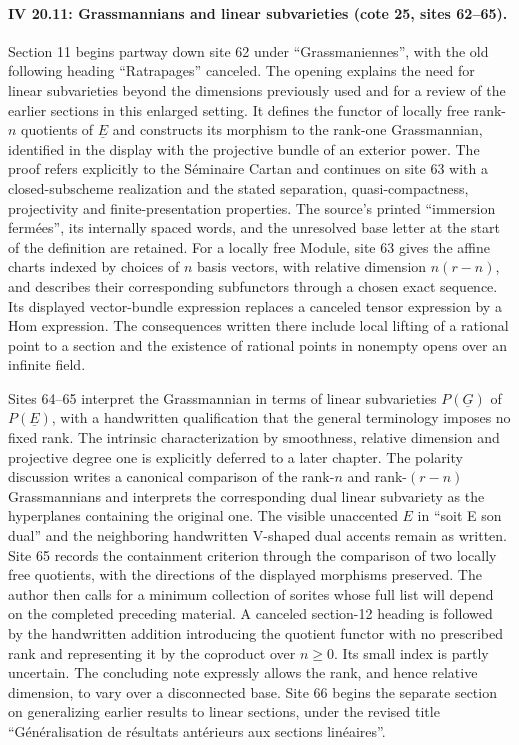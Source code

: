 \paragraph{IV 20.11: Grassmannians and linear subvarieties (cote 25, sites 62--65).}
Section 11 begins partway down site 62 under ``Grassmaniennes'', with the old following heading ``Ratrapages'' canceled. The opening explains the need for linear subvarieties beyond the dimensions previously used and for a review of the earlier sections in this enlarged setting. It defines the functor of locally free rank-$n$ quotients of $\underline E$ and constructs its morphism to the rank-one Grassmannian, identified in the display with the projective bundle of an exterior power. The proof refers explicitly to the S\'eminaire Cartan and continues on site 63 with a closed-subscheme realization and the stated separation, quasi-compactness, projectivity and finite-presentation properties. The source's printed ``immersion ferm\'ees'', its internally spaced words, and the unresolved base letter at the start of the definition are retained. For a locally free Module, site 63 gives the affine charts indexed by choices of $n$ basis vectors, with relative dimension $n(r-n)$, and describes their corresponding subfunctors through a chosen exact sequence. Its displayed vector-bundle expression replaces a canceled tensor expression by a Hom expression. The consequences written there include local lifting of a rational point to a section and the existence of rational points in nonempty opens over an infinite field.

Sites 64--65 interpret the Grassmannian in terms of linear subvarieties $P(\underline G)$ of $P(\underline E)$, with a handwritten qualification that the general terminology imposes no fixed rank. The intrinsic characterization by smoothness, relative dimension and projective degree one is explicitly deferred to a later chapter. The polarity discussion writes a canonical comparison of the rank-$n$ and rank-$(r-n)$ Grassmannians and interprets the corresponding dual linear subvariety as the hyperplanes containing the original one. The visible unaccented $E$ in ``soit E son dual'' and the neighboring handwritten V-shaped dual accents remain as written. Site 65 records the containment criterion through the comparison of two locally free quotients, with the directions of the displayed morphisms preserved. The author then calls for a minimum collection of sorites whose full list will depend on the completed preceding material. A canceled section-12 heading is followed by the handwritten addition introducing the quotient functor with no prescribed rank and representing it by the coproduct over $n\geq0$. Its small index is partly uncertain. The concluding note expressly allows the rank, and hence relative dimension, to vary over a disconnected base. Site 66 begins the separate section on generalizing earlier results to linear sections, under the revised title ``Généralisation de résultats antérieurs aux sections linéaires''.
